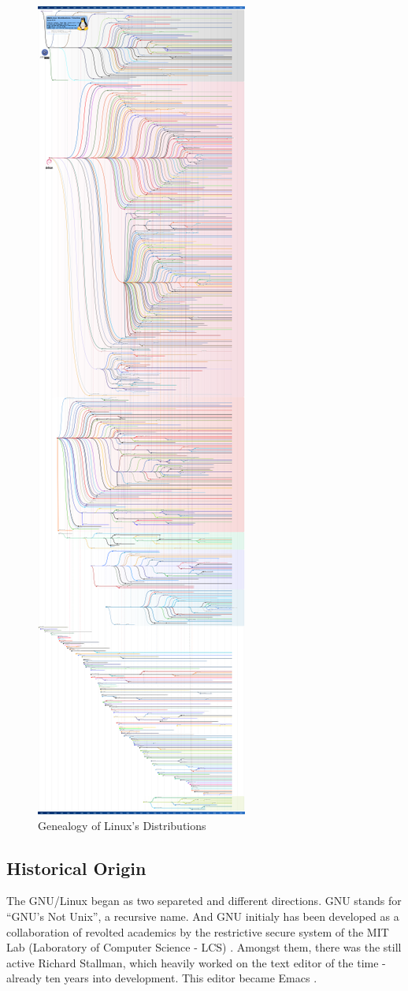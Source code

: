 \documentclass[
12pt,				%
openright,			%
oneside,			%
a4paper,			%
brazil,				%
english,			%
]{abntex2}
\begin{document}
\begin{figure}[!htb]
  \caption{\label{fig:linux-genealogy} Genealogy of Linux's Distributions}
  \includegraphics[height=\textwidth, angle=-90]{diversidade}
\end{figure}


\subsection{\label{sec:linux-origin}Historical Origin}

The GNU/Linux began as two separeted and different directions. GNU
stands for ``GNU's Not Unix'', a recursive name. And GNU initialy has
been developed as a collaboration of revolted academics by the
restrictive secure system of the MIT Lab (Laboratory of Computer
Science - LCS) \cite{stallman2002my,emacswiki2021history}. Amongst
them, there was the still active Richard Stallman, which heavily
worked on the text editor of the time - already ten years into
development. This editor became Emacs \cite{emacswiki2021history}.   
\end{document}
